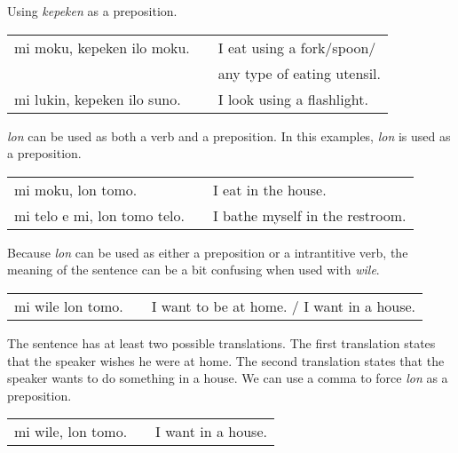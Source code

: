 
Using \textit{kepeken} as a preposition.

\begin{supertabular}{p{5,5cm}|ll}
mi moku, kepeken ilo moku. && I eat using a fork/spoon/ \\ && any type of eating utensil. \\
mi lukin, kepeken ilo suno. && I look using a flashlight.  \\
\end{supertabular} 

%
%
\textit{lon} can be used as both a verb and a preposition. 
In this examples, \textit{lon} is used as a preposition.

\begin{supertabular}{p{5,5cm}|ll}
mi moku, lon tomo. && I eat in the house. \\
mi telo e mi, lon tomo telo. && I bathe myself in the restroom. \\
\end{supertabular} 

Because \textit{lon} can be used as either a preposition or a intrantitive verb, the meaning of the sentence can be a bit confusing when used with \textit{wile}. 

\begin{supertabular}{p{5,5cm}|ll}
mi wile lon tomo. && I want to be at home. / I want in a house. \\
\end{supertabular} 

The sentence has at least two possible translations. 
The first translation states that the speaker wishes he were at home. 
The second translation states that the speaker wants to do something in a house. 
We can use a comma to force \textit{lon} as a preposition.

\begin{supertabular}{p{5,5cm}|ll}
mi wile, lon tomo. && I want in a house. \\
\end{supertabular}

